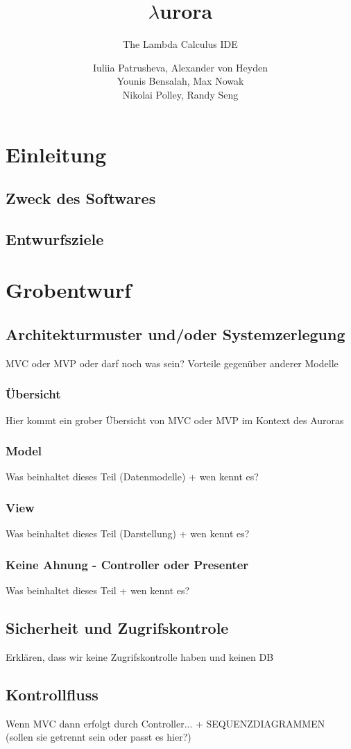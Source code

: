 \documentclass[parskip=full,11pt,twoside]{scrartcl}
\title{$\lambda$urora}
\subtitle{The Lambda Calculus IDE}
\author{Iuliia Patrusheva, Alexander von Heyden\\
Younis Bensalah, Max Nowak\\
Nikolai Polley, Randy Seng}
\begin{document}
\maketitle
\pagebreak
\tableofcontents
\pagebreak
\section{Einleitung}
\subsection{Zweck des Softwares}
\subsection{Entwurfsziele}
\pagebreak

\section{Grobentwurf}
\subsection{Architekturmuster und/oder Systemzerlegung}
MVC oder MVP oder darf noch was sein?
Vorteile gegenüber anderer Modelle
\subsubsection{Übersicht}
Hier kommt ein grober Übersicht von MVC oder MVP im Kontext des Auroras
\subsubsection{Model}
Was beinhaltet dieses Teil (Datenmodelle) + wen kennt es?
\subsubsection{View}
Was beinhaltet dieses Teil (Darstellung) + wen kennt es?
\subsubsection{Keine Ahnung - Controller oder Presenter}
Was beinhaltet dieses Teil + wen kennt es?


\subsection{Sicherheit und Zugrifskontrole}
Erklären, dass wir keine Zugrifskontrolle haben und keinen DB
\subsection{Kontrollfluss}
Wenn MVC dann erfolgt durch Controller...  + SEQUENZDIAGRAMMEN (sollen sie getrennt sein oder passt es hier?)
\end{document}
